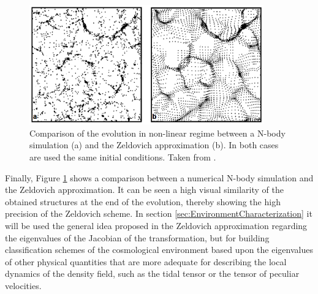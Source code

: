 \begin{figure}[htbp]
	\centering
	\includegraphics[width=0.9\textwidth]
	{./figures/2_theoretical_framework/Zeldovich_Approximation.png}

	\caption{\small{Comparison of the evolution in non-linear regime
	between a N-body simulation (a) and the Zeldovich approximation (b).
	In both cases are used the same initial conditions. Taken from
	\cite{longair2008}. }}
	
	\label{fig:ZeldovichComparison}
\end{figure}


Finally, Figure \ref{fig:ZeldovichComparison} shows a comparison between a
numerical N-body simulation and the Zeldovich approximation. It can be 
seen a high visual similarity of the obtained structures at the end of the
evolution, thereby showing the high precision of the Zeldovich scheme.
In section \ref{sec:EnvironmentCharacterization} it will be used the
general idea proposed in the Zeldovich approximation regarding the 
eigenvalues of the Jacobian of the transformation, but for building 
classification schemes of the cosmological environment based upon the 
eigenvalues of other physical quantities that are more adequate for 
describing the local dynamics of the density field, such as the tidal 
tensor or the tensor of peculiar velocities.



